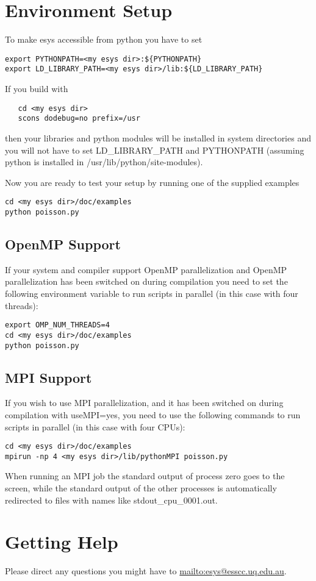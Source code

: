\section{Environment Setup}
To make esys accessible from python you have to set
\begin{verbatim}
export PYTHONPATH=<my esys dir>:${PYTHONPATH}
export LD_LIBRARY_PATH=<my esys dir>/lib:${LD_LIBRARY_PATH}
\end{verbatim}

If you build \esys with
\begin{verbatim}
   cd <my esys dir>
   scons dodebug=no prefix=/usr
\end{verbatim}
then your libraries and python modules will be installed in system directories and you will
not have to set LD_LIBRARY_PATH and PYTHONPATH (assuming python is installed in
/usr/lib/python/site-modules).

Now you are ready to test your setup by running one of the supplied examples
\begin{verbatim}
cd <my esys dir>/doc/examples
python poisson.py
\end{verbatim}

\subsection{OpenMP Support}

If your system and compiler support OpenMP parallelization and OpenMP parallelization has been switched on during compilation you need to set the following environment variable to run scripts in parallel (in this case with four threads):
\begin{verbatim}
export OMP_NUM_THREADS=4
cd <my esys dir>/doc/examples
python poisson.py
\end{verbatim}

\subsection{MPI Support}

If you wish to use MPI parallelization, and it has been switched on during compilation with useMPI=yes, you need to use the following commands to run scripts in parallel (in this case with four CPUs):
\begin{verbatim}
cd <my esys dir>/doc/examples
mpirun -np 4 <my esys dir>/lib/pythonMPI poisson.py
\end{verbatim}

When running an MPI job the standard output of process zero goes to the screen, while the standard output of the other processes
is automatically redirected to files with names like stdout_cpu_0001.out.

\section{Getting Help}
Please direct any questions you might have to \url{mailto:esys@esscc.uq.edu.au}.
